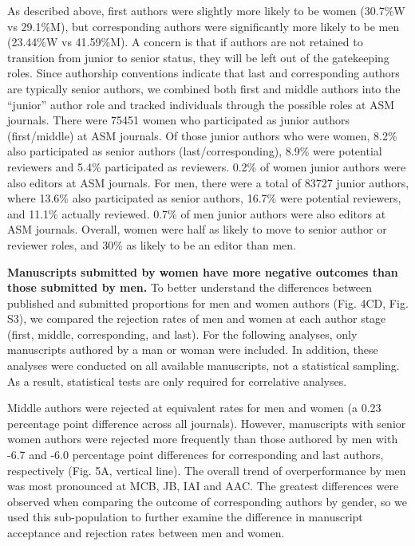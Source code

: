 \documentclass[11pt,]{article}
\begin{document}
As described above, first authors were slightly more likely to be women
(30.7\%W vs 29.1\%M), but corresponding authors were significantly more
likely to be men (23.44\%W vs 41.59\%M). A concern is that if authors
are not retained to transition from junior to senior status, they will
be left out of the gatekeeping roles. Since authorship conventions
indicate that last and corresponding authors are typically senior
authors, we combined both first and middle authors into the ``junior''
author role and tracked individuals through the possible roles at ASM
journals. There were 75451 women who participated as junior authors
(first/middle) at ASM journals. Of those junior authors who were women,
8.2\% also participated as senior authors (last/corresponding), 8.9\%
were potential reviewers and 5.4\% participated as reviewers. 0.2\% of
women junior authors were also editors at ASM journals. For men, there
were a total of 83727 junior authors, where 13.6\% also participated as
senior authors, 16.7\% were potential reviewers, and 11.1\% actually
reviewed. 0.7\% of men junior authors were also editors at ASM journals.
Overall, women were half as likely to move to senior author or reviewer
roles, and 30\% as likely to be an editor than men.

\textbf{Manuscripts submitted by women have more negative outcomes than
those submitted by men.} To better understand the differences between
published and submitted proportions for men and women authors (Fig. 4CD,
Fig. S3), we compared the rejection rates of men and women at each
author stage (first, middle, corresponding, and last). For the following
analyses, only manuscripts authored by a man or woman were included. In
addition, these analyses were conducted on all available manuscripts,
not a statistical sampling. As a result, statistical tests are only
required for correlative analyses.

Middle authors were rejected at equivalent rates for men and women (a
0.23 percentage point difference across all journals). However,
manuscripts with senior women authors were rejected more frequently than
those authored by men with -6.7 and -6.0 percentage point differences
for corresponding and last authors, respectively (Fig. 5A, vertical
line). The overall trend of overperformance by men was most pronounced
at MCB, JB, IAI and AAC. The greatest differences were observed when
comparing the outcome of corresponding authors by gender, so we used
this sub-population to further examine the difference in manuscript
acceptance and rejection rates between men and women.
\end{document}
